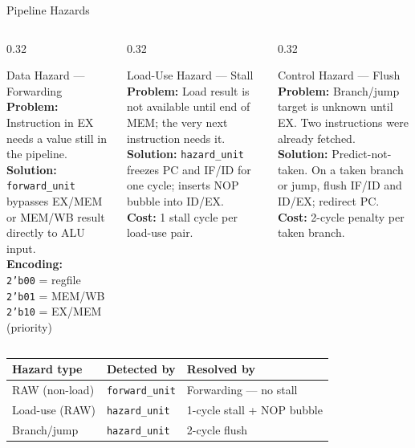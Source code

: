 \documentclass[aspectratio=169,10pt]{beamer}
\begin{document}
\begin{frame}{Pipeline Hazards}
  \begin{columns}[T]
    \begin{column}{0.32\textwidth}
      \begin{block}{Data Hazard --- Forwarding}
        \textbf{Problem:} Instruction in EX needs a value still in the pipeline.\\[0.4em]
        \textbf{Solution:} \texttt{forward\_unit} bypasses EX/MEM or MEM/WB result directly to ALU input.\\[0.4em]
        \textbf{Encoding:}\\
        \texttt{2'b00} = regfile\\
        \texttt{2'b01} = MEM/WB\\
        \texttt{2'b10} = EX/MEM (priority)
      \end{block}
    \end{column}
    \begin{column}{0.32\textwidth}
      \begin{block}{Load-Use Hazard --- Stall}
        \textbf{Problem:} Load result is not available until end of MEM; the very next instruction needs it.\\[0.4em]
        \textbf{Solution:} \texttt{hazard\_unit} freezes PC and IF/ID for one cycle; inserts NOP bubble into ID/EX.\\[0.4em]
        \textbf{Cost:} 1 stall cycle per load-use pair.
      \end{block}
    \end{column}
    \begin{column}{0.32\textwidth}
      \begin{block}{Control Hazard --- Flush}
        \textbf{Problem:} Branch/jump target is unknown until EX. Two instructions were already fetched.\\[0.4em]
        \textbf{Solution:} Predict-not-taken. On a taken branch or jump, flush IF/ID and ID/EX; redirect PC.\\[0.4em]
        \textbf{Cost:} 2-cycle penalty per taken branch.
      \end{block}
    \end{column}
  \end{columns}

  \vspace{0.8em}
  \begin{center}
  \small
  \begin{tabular}{lll}
    \toprule
    Hazard type & Detected by & Resolved by \\
    \midrule
    RAW (non-load) & \texttt{forward\_unit} & Forwarding --- no stall \\
    Load-use (RAW) & \texttt{hazard\_unit}  & 1-cycle stall + NOP bubble \\
    Branch/jump    & \texttt{hazard\_unit}  & 2-cycle flush \\
    \bottomrule
  \end{tabular}
  \end{center}
\end{frame}
\end{document}
